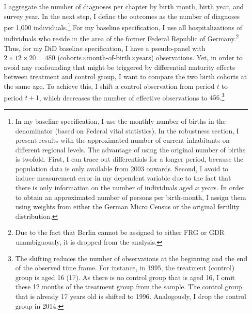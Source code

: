 \documentclass[11pt, a4paper,draft]{article} %
\begin{document}
I aggregate the number of diagnoses per chapter by birth month, birth year, and survey year. In the next step, I define the outcomes as the number of diagnoses per 1,000 individuals.\footnote{In my baseline specification, I use the monthly number of births in the denominator (based on Federal vital statistics). In the robustness section, I present results with the approximated number of current inhabitants on different regional levels. The advantage of using the original number of births is twofold. First, I can trace out differentials for a longer period, because the population data is only available from 2003 onwards. Second, I avoid to induce measurement error in my dependent variable due to the fact that there is only information on the number of individuals aged $x$ years. In order to obtain an approximated number of persons per birth-month, I assign them using weights from either the German Micro Census or the original fertility distribution.} For my baseline specification, I use all hospitalizations of individuals who reside in the area of the former Federal Republic of Germany.\footnote{Due to the fact that Berlin cannot be assigned to either FRG or GDR unambiguously, it is dropped from the analysis.} Thus, for my DiD baseline specification, I have a pseudo-panel with $2\times12\times20=480$ (cohorts$\times$month-of-birth$\times$years) observations. Yet, in order to avoid any confounding that might be triggered by differential maturity effects between treatment and control group, I want to compare the two birth cohorts at the same age. To achieve this, I shift a control observation from period $t$ to period $t+1$, which decreases the number of effective observations to $456$.\footnote{The shifting reduces the number of observations at the beginning and the end of the observed time frame. For instance, in 1995, the treatment (control) group is aged 16 (17). As there is no control group that is aged 16, I omit these 12 months of the treatment group from the sample. The control group that is already 17 years old is shifted to 1996. Analogously, I drop the control group in 2014.} \newline %

\end{document}
